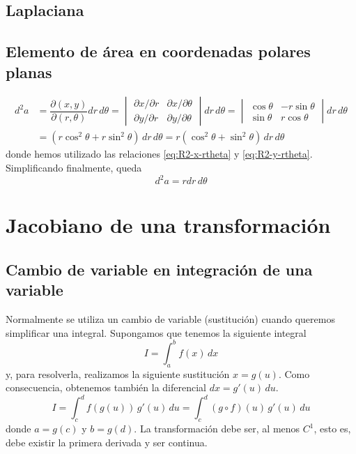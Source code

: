 \section{Laplaciana} 

\section{Elemento de área en coordenadas polares planas}
\begin{align*}
  d^2a
  &=
    \dfrac{\partial(x,y)}{\partial(r,\theta)} dr\,d\theta
  = \begin{vmatrix}
    \partial x/\partial r & \partial x/\partial\theta\\
    \partial y/\partial r & \partial y/\partial\theta
  \end{vmatrix}
  dr\,d\theta
  = \begin{vmatrix}
    \cos\theta & -r\sin\theta\\
    \sin\theta & r\cos\theta
  \end{vmatrix}
    dr\,d\theta\\
  &=
    (r\cos^2\theta + r\sin^2\theta)\,dr\,d\theta
    = r (\cos^2\theta + \sin^2\theta)\,dr\,d\theta
\end{align*}
donde hemos utilizado las relaciones \eqref{eq:R2-x-rtheta} y \eqref{eq:R2-y-rtheta}.
Simplificando finalmente, queda
\begin{equation}
  d^2a = rdr\,d\theta
\end{equation}

\chapter{Jacobiano de una transformación}
\section{Cambio de variable en integración de una variable}
Normalmente se utiliza un cambio de variable (sustitución) cuando queremos simplificar
una integral.
Supongamos que tenemos la siguiente integral
\begin{equation}
  I= \int_a^b \!f(x)\, dx
\end{equation}
y, para resolverla, realizamos la siguiente sustitución $x = g(u)$.
Como consecuencia, obtenemos también la diferencial $dx=g'(u)\,du$.
\begin{equation}
  I = \int_c^d \!f(g(u))\,g'(u)\,du = \int_c^d\!(g\circ f)(u)\,g'(u)\,du
\end{equation}
donde $a=g(c)$ y $b=g(d)$. La transformación debe ser, al menos $C^1$, esto es, debe
existir la primera derivada y ser continua.

